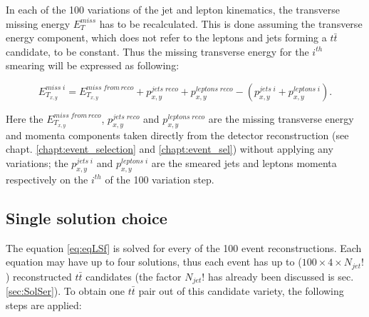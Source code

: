 In each of the 100 variations of the jet and lepton kinematics, the transverse missing energy $E_{T}^{miss}$ has to be recalculated. This is done
assuming the transverse energy component, which does not refer to the leptons and jets forming a $t\bar{t}$ candidate, to be constant. Thus the
missing transverse energy for the $i^{th}$ smearing will be expressed as following:

\begin{equation}
 E^{miss\;i}_{T_{x,y}} = E^{miss \; from \, reco}_{T_{x,y}} + p^{jets \; reco}_{x,y} + p^{leptons\;reco}_{x,y} - (p^{jets\;i}_{x,y} + p^{leptons\;i}_{x,y}).
\end{equation}

Here the $E^{miss \; from \, reco}_{T_{x,y}}$, $p^{jets \; reco}_{x,y}$ and $p^{leptons\;reco}_{x,y}$ are the missing transverse energy and momenta
components taken directly from the detector reconstruction (see chapt. \ref{chapt:event_selection} and \ref{chapt:event_sel}) without applying any 
variations; the $p^{jets\;i}_{x,y}$ and $p^{leptons\;i}_{x,y}$ are the smeared jets and leptons momenta respectively on the $i^{th}$ of the 100 
variation step.

\subsection{Single solution choice}

The equation \ref{eq:eqLSf} is solved for every of the 100 event reconstructions. Each equation may have up to four solutions, thus each event
has up to ($100 \times 4 \times N_{jet}!$) reconstructed $t\bar{t}$ candidates (the factor $N_{jet}!$ has already been discussed is sec. \ref{sec:SolSer}). 
To obtain one $t\bar{t}$ pair out of this candidate variety, the following steps are applied:


